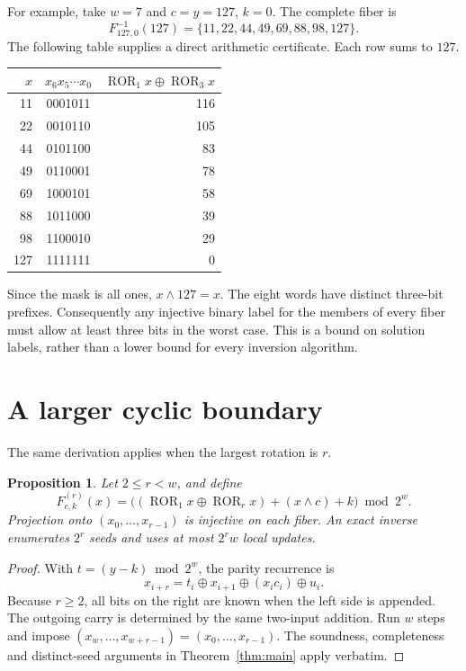 \documentclass[11pt,a4paper]{article}
\newtheorem{proposition}[theorem]{Proposition}
\newcommand{\xor}{\mathbin{\oplus}}
\DeclareMathOperator{\ROR}{ROR}
\begin{document}
For example, take $w=7$ and $c=y=127$, $k=0$. The complete fiber is
\begin{equation}\label{eq:example}
 F_{127,0}^{-1}(127)=\{11,22,44,49,69,88,98,127\}.
\end{equation}
The following table supplies a direct arithmetic certificate. Each row sums to $127$.
\begin{center}
\begin{tabular}{rcr}
\toprule
$x$ & $x_6x_5\cdots x_0$ & $\ROR_1x\xor\ROR_3x$\\
\midrule
11 & 0001011 & 116\\
22 & 0010110 & 105\\
44 & 0101100 & 83\\
49 & 0110001 & 78\\
69 & 1000101 & 58\\
88 & 1011000 & 39\\
98 & 1100010 & 29\\
127 & 1111111 & 0\\
\bottomrule
\end{tabular}
\end{center}
Since the mask is all ones, $x\land127=x$. The eight words have distinct three-bit prefixes. Consequently any injective binary label for the members of every fiber must allow at least three bits in the worst case. This is a bound on solution labels, rather than a lower bound for every inversion algorithm.

\section{A larger cyclic boundary}
The same derivation applies when the largest rotation is $r$.

\begin{proposition}\label{prop:general}
Let $2\le r<w$, and define
\[
 F^{(r)}_{c,k}(x)=
 \bigl((\ROR_1x\xor\ROR_rx)+(x\land c)+k\bigr)\bmod2^w.
\]
Projection onto $(x_0,\ldots,x_{r-1})$ is injective on each fiber. An exact inverse enumerates $2^r$ seeds and uses at most $2^r w$ local updates.
\end{proposition}

\begin{proof}
With $t=(y-k)\bmod2^w$, the parity recurrence is
\[
 x_{i+r}=t_i\xor x_{i+1}\xor(x_ic_i)\xor u_i.
\]
Because $r\ge2$, all bits on the right are known when the left side is appended. The outgoing carry is determined by the same two-input addition. Run $w$ steps and impose
$(x_w,\ldots,x_{w+r-1})=(x_0,\ldots,x_{r-1})$.
The soundness, completeness and distinct-seed arguments in Theorem~\ref{thm:main} apply verbatim.
\end{proof}
\end{document}
